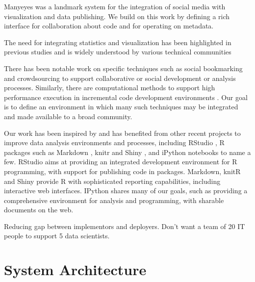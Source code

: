 \documentclass[review,journal]{vgtc}         %
\begin{document}
Manyeyes \cite{Viegas:2007:MAS} was a landmark system for the integration
of social media with visualization and data publishing. We build on this
work by defining a rich interface for collaboration about code and for
operating on metadata.

The need for integrating statistics and visualization has been
highlighted in previous studies and is widely understood by
various technical communities \cite{Perer:2008:ISA}

There has been notable work on specific techniques such as
social bookmarking \cite{Millen:2006:DSB} \cite{Heer:2007:VAV}
and crowdsourcing \cite{Fast:2014:ECS} to support collaborative
or social development or analysis processes.
Similarly, there are computational methods to support high
performance execution in incremental code development
environments \cite{Guo:2010:TPI}.
Our goal is to define an environment in which many such
techniques may be integrated and made available to a broad community.

\cite{Santos:2009:VST}

\cite{Mates:2011:CSA}

\cite{Keim:2008:VAS}

Our work has been inspired by and has benefited from other recent projects
to improve data analysis environments and processes,
including RStudio \cite{RStudio:2013:SWA},
R packages such as Markdown \cite{Allaire:2014:MMR},
knitr \cite{Xie:2013:DDW}
and Shiny \cite{RStudio:2013:SWA},
and iPython notebooks \cite{Perez:2007:IAS}
to name a few. RStudio aims at providing an integrated development environment
for R programming, with support for publishing code in packages. Markdown,
knitR and Shiny provide R with sophisticated reporting capabilities, including
interactive web interfaces. IPython \cite{Perez:2007:IAS}
shares many of our goals, such as providing a comprehensive environment
for analysis and programming, with sharable documents on the web.

Reducing gap between implementors and deployers. Don't want a team of
20 IT people to support 5 data scientists.


\section{System Architecture}
\end{document}
